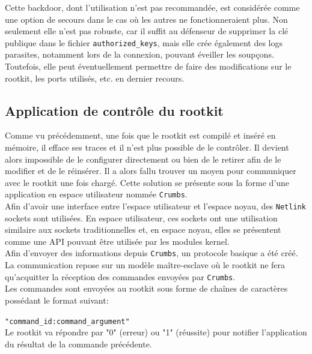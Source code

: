 \documentclass[12pt]{article}
\begin{document}
            Cette backdoor, dont l'utilisation n'est pas recommandée, est considérée comme une option de secours dans le cas où les autres ne fonctionneraient plus. Non seulement elle n'est pas robuste, car il suffit au défenseur de supprimer la clé publique dans le fichier \texttt{authorized\_keys}, mais elle crée également des logs parasites, notamment lors de la connexion, pouvant éveiller les soupçons. Toutefois, elle peut éventuellement permettre de faire des modifications sur le rootkit, les ports utilisés, etc. en dernier recours.  

    \subsection{Application de contrôle du rootkit}
    \label{sec:crumb}

        Comme vu précédemment, une fois que le rootkit est compilé et inséré en mémoire, il efface ses traces et il n'est plus possible de le contrôler. Il devient alors impossible de le configurer directement ou bien de le retirer afin de le modifier et de le réinsérer. Il a alors fallu trouver un moyen pour communiquer avec le rootkit une fois chargé. Cette solution se présente sous la forme d'une application en espace utilisateur nommée \texttt{Crumbs}. \\

        Afin d'avoir une interface entre l'espace utilisateur et l'espace noyau, des \texttt{Netlink} sockets sont utilisées. En espace utilisateur, ces sockets ont une utilisation similaire aux sockets traditionnelles et, en espace noyau, elles se présentent comme une API pouvant être utilisée par les modules kernel. \\

        Afin d'envoyer des informations depuis \texttt{Crumbs}, un protocole basique a été créé. La communication repose sur un modèle maître-esclave où le rootkit ne fera qu'acquitter la réception des commandes envoyées par \texttt{Crumbs}. \\
        Les commandes sont envoyées au rootkit sous forme de chaînes de caractères possédant le format suivant:

        \texttt{"command\_id:command\_argument"}\\
        Le rootkit va répondre par "0" (erreur) ou "1" (réussite) pour notifier l'application du résultat de la commande précédente.
\end{document}
